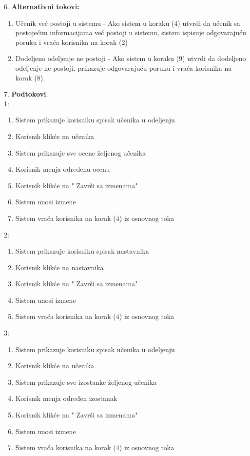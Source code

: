 \documentclass{article}
\begin{document}
6. \textbf{Alternativni tokovi:}
\begin{enumerate} 
\item Učenik već postoji u sistemu - Ako sistem u koraku (4) utvrdi da učenik sa postojećim informacijama već postoji u sistemu, sistem ispisuje odgovarajuću poruku i vraća korisnika na korak (2) 
\item Dodeljeno odeljenje ne postoji - Ako sistem u koraku (9) utvrdi da dodeljeno odeljenje ne postoji, prikazuje odgovarajuću poruku i vraća korisnika na korak (8).
\end{enumerate}

7. \textbf{Podtokovi}:  \\
1: \\
\begin{enumerate}
\item Sistem prikazuje korisniku spisak učenika u odeljenju
\item Korisnik klikće na učenika
\item Sistem prikazuje sve ocene željenog učenika
\item Korisnik menja određenu ocenu
\item Korisnik klikće na  " {Završi} sa izmenama"
\item Sistem unosi izmene
\item Sistem vraća korisnika na korak (4) iz osnovnog toka
\end{enumerate}
2: \\
\begin{enumerate}
\item Sistem prikazuje korisniku spisak nastavnika
\item Korisnik klikće na nastavnika
\item Korisnik klikće na  " {Završi} sa izmenama"
\item Sistem unosi izmene
\item Sistem vraća korisnika na korak (4) iz osnovnog toka
\end{enumerate}
3: \\
\begin{enumerate}
\item Sistem prikazuje korisniku spisak učenika u odeljenju
\item Korisnik klikće na učenika
\item Sistem prikazuje sve izostanke željenog učenika
\item Korisnik menja određen izostanak
\item Korisnik klikće na  " {Završi} sa izmenama"
\item Sistem unosi izmene
\item Sistem vraća korisnika na korak (4) iz osnovnog toka
\end{enumerate}
\end{document}
